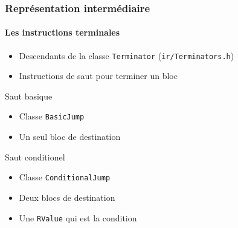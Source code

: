 \documentclass{beamer}
\begin{document}
\begin{frame}
    \frametitle{Représentation intermédiaire}
    \framesubtitle{Les instructions terminales}
    \begin{itemize}
        \item Descendants de la classe \lstinline{Terminator} (\lstinline{ir/Terminators.h})
        \item Instructions de saut pour terminer un bloc
    \end{itemize}
    \pause
    \begin{block}{Saut basique}
        \begin{itemize}
            \item Classe \lstinline{BasicJump}
            \item Un seul bloc de destination
        \end{itemize}
    \end{block}
    \pause
    \begin{block}{Saut conditionel}
        \begin{itemize}
            \item Classe \lstinline{ConditionalJump}
            \item Deux blocs de destination
            \item Une \lstinline{RValue} qui est la condition
        \end{itemize}
    \end{block}
\end{frame}
\end{document}
